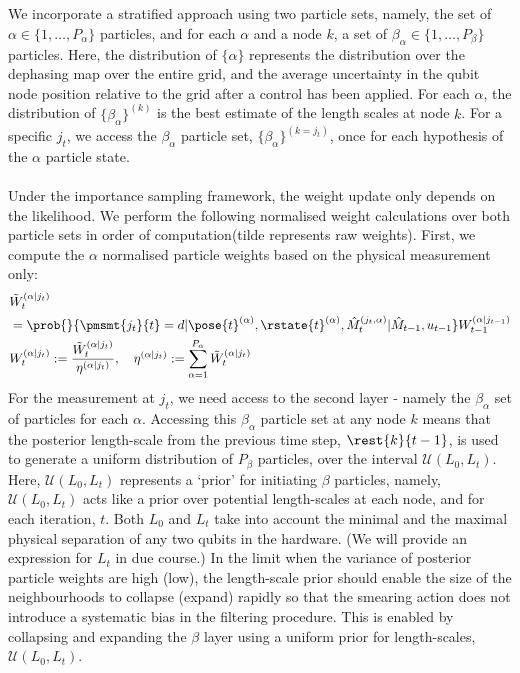 \\
\\
We incorporate a stratified approach using two particle sets, namely, the set of $\alpha \in \{1, \hdots ,P_\alpha\}$ particles, and for each $\alpha$ and a node $k$, a set of $\beta_\alpha \in \{1, \hdots ,P_\beta\}$ particles. Here, the distribution of $\{\alpha \}$  represents the distribution over the dephasing map over the entire grid, and the average uncertainty in the qubit node position relative to the grid after a control has been applied. For each $\alpha$, the distribution of $\{ \beta_\alpha \}^{(k)} $ is the best estimate of the length scales at node $k$. For a specific $j_t$, we access the $\beta_\alpha$ particle set, $\{ \beta_\alpha \}^{(k=j_t)} $, once for each hypothesis of the $\alpha$ particle state. \\
\\
Under the importance sampling framework, the weight update only depends on the likelihood. We perform the following normalised weight calculations over both particle sets in order of computation(tilde represents raw weights). First, we compute the $\alpha$ normalised particle weights based on the physical measurement only:
\begin{align}
&\tilde{W}_t^{( \alpha | j_t)} \nonumber \\
& = \prob{}{\pmsmt{j_t}{t}=d | \pose{t}^{(\alpha)}, \rstate{t}^{(\alpha)}, \hat{M}_t^{(j_t, \alpha)}| \hat{M}_{t-1}, u_{t-1 }} W_{t-1}^{( \alpha | j_{t-1})}  \label{eqn:slam:PF:4:alpha:raw}\\
&W_t^{( \alpha | j_t)} := \frac{\tilde{W}_t^{( \alpha | j_t)}}{\eta^{( \alpha | j_t)}}, \quad \eta^{( \alpha | j_t)} := \sum_{\alpha = 1}^{P_{\alpha}} \tilde{W}_t^{( \alpha | j_t)}  \label{eqn:slam:PF:5:alpha:norm}
\end{align} For the measurement at $j_t$, we need access to the second layer - namely the $\beta_\alpha$ set of particles for each $\alpha$.  Accessing this $\beta_\alpha$ particle set at any node $k$ means that the posterior length-scale from the previous time step, $\rest{k}{t-1}$, is used to generate a uniform distribution of  $P_\beta$ particles, over the interval $\mathcal{U}(L_0, L_t)$. Here, $\mathcal{U}(L_0, L_t)$ represents a `prior' for initiating $\beta$ particles, namely, $\mathcal{U}(L_0, L_t)$ acts like a prior over potential length-scales at each node, and for each iteration, $t$. Both $L_0$ and $L_t$ take into account the minimal and the maximal physical separation of any two qubits in the hardware. (We will provide an expression for $L_t$ in due course.) In the limit when the variance of posterior particle weights are high (low), the length-scale prior should enable the size of the neighbourhoods to collapse (expand) rapidly so that the smearing action does not introduce a systematic bias in the filtering procedure. This is enabled by collapsing and expanding the $\beta$ layer using a uniform prior for length-scales, $\mathcal{U}(L_0, L_t)$.\\
